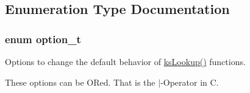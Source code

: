 \subsection{Enumeration Type Documentation}
\hypertarget{group__keyset_ga98a3d6a4016c9dad9cbd1a99a9c2a45a}{
\subsubsection[{option\-\_\-t}]{\setlength{\rightskip}{0pt plus 5cm}enum {\bf option\-\_\-t}}}\label{group__keyset_ga98a3d6a4016c9dad9cbd1a99a9c2a45a}


Options to change the default behavior of \hyperlink{group__keyset_gaa34fc43a081e6b01e4120daa6c112004}{ks\-Lookup()} functions. 

These options can be O\-Red. That is the $|$-\/\-Operator in C.

